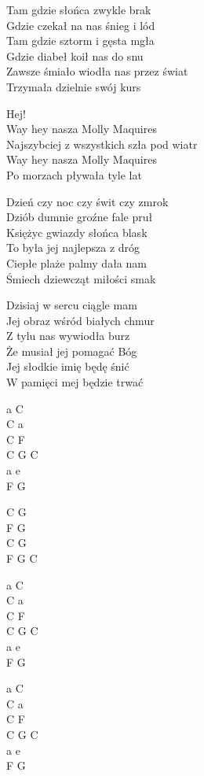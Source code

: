 \begin{text}
   
    Tam gdzie słońca zwykle brak\\ 
    Gdzie czekał na nas śnieg i lód\\ 
    Tam gdzie sztorm i gęsta mgła \\
    Gdzie diabeł koił nas do snu \\
    Zawsze śmiało wiodła nas przez świat \\
    Trzymała dzielnie swój kurs 

    \vin Hej!\\
    \vin Way hey nasza Molly Maquires\\ 
    \vin Najszybciej z wszystkich szła pod wiatr\\ 
    \vin Way hey nasza Molly Maquires \\
    \vin Po morzach pływała tyle lat 

    Dzień czy noc czy świt czy zmrok\\
    Dziób dumnie groźne fale pruł\\
    Księżyc gwiazdy słońca blask\\
    To była jej najlepsza z dróg\\
    Ciepłe plaże palmy dała nam\\
    Śmiech dziewcząt miłości smak

    Dzisiaj w sercu ciągle mam\\
    Jej obraz wśród białych chmur\\
    Z tylu nas wywiodła burz\\
    Że musiał jej pomagać Bóg\\
    Jej słodkie imię będę śnić\\
    W pamięci mej będzie trwać
   

\end{text}
\begin{chord}
    a C\\ 
    C a\\ 
    C F\\ 
    C G C\\ 
    a e\\ 
    F G
 
 \hfill\break %
    C G\\ 
    F G\\ 
    C G\\ 
    F G C 

    a C\\ 
    C a\\ 
    C F\\ 
    C G C\\ 
    a e\\ 
    F G
 
    a C\\ 
    C a\\ 
    C F\\ 
    C G C\\ 
    a e\\ 
    F G
\end{chord}